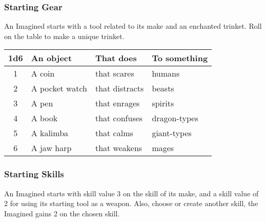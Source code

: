\begin{multicols}{2}
    \subsubsection*{Starting Gear}
    An Imagined starts with a tool related to its make and an enchanted trinket. Roll on the table to make a unique trinket.
    
    \begin{adjustbox}{width=0.9\columnwidth,center}
      \begin{tabular}{|c|l|l|l|}
      \hline
      \textbf{1d6} & \textbf{An object} & \textbf{That does} & \textbf{To something} \\
      \hline
      1 & A coin & that scares & humans \\
      2 & A pocket watch & that distracts & beasts \\
      3 & A pen & that enrages & spirits \\
      4 & A book & that confuses & dragon-types \\
      5 & A kalimba & that calms & giant-types \\
      6 & A jaw harp & that weakens & mages \\
      \hline
      \end{tabular}
      \end{adjustbox}

    \subsubsection*{Starting Skills}
    An Imagined starts with skill value 3 on the skill of its make, and a skill value of 2 for using its starting tool as a weapon. Also, choose or create another skill, the Imagined gains 2 on the chosen skill.
\end{multicols}

